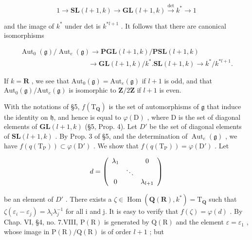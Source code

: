 \[
1 \longrightarrow \mathbf {S L} (l + 1, k) \longrightarrow \mathbf {G L} (l + 1, k) \stackrel {\det} {\longrightarrow} k ^ {*} \longrightarrow 1
\]

and the image of \(k^*\) under det is \(k^{*l + 1}\) . It follows that there are canonical isomorphisms

\[
\begin{array}{c} \operatorname{Aut} _ {0} (\mathfrak {g}) / \operatorname{Aut} _ {e} (\mathfrak {g}) \longrightarrow \mathbf {P G L} (l + 1, k) / \mathbf {P S L} (l + 1, k) \\ \qquad \qquad \qquad \qquad \qquad \longrightarrow \mathbf {G L} (l + 1, k) / k ^ {*}. \mathbf {S L} (l + 1, k) \longrightarrow k ^ {*} / k ^ {*   l + 1}. \end{array}
\]

If \(k = \mathbf{R}\) , we see that \(\mathrm{Aut}_0(\mathfrak{g}) = \mathrm{Aut}_e(\mathfrak{g})\) if \(l + 1\) is odd, and that \(\mathrm{Aut}_0(\mathfrak{g}) / \mathrm{Aut}_e(\mathfrak{g})\) is isomorphic to \(\mathbf{Z}/2\mathbf{Z}\) if \(l + 1\) is even.

With the notations of §5, \(f(\mathrm{T}_{\mathbf{Q}})\) is the set of automorphisms of \(\mathfrak{g}\) that induce the identity on \(\mathfrak{h}\), and hence is equal to \(\varphi(\mathrm{D})\) , where D is the set of diagonal elements of \(\mathbf{GL}(l+1,k)\) (§5, Prop. 4). Let \(D'\) be the set of diagonal elements of \(\mathbf{SL}(l+1,k)\) . By Prop. 3 of §5, and the determination of \(\operatorname{Aut}_{e}(\mathfrak{g})\) , we have \(f(q(\mathrm{T}_{\mathrm{P}})) \subset \varphi(\mathrm{D}')\) . We show that \(f(q(\mathrm{T}_{\mathrm{P}})) = \varphi(\mathrm{D}')\) . Let

\[
d = \left( \begin{array}{c c c} \lambda_ {1} & & 0 \\ & \ddots & \\ 0 & & \lambda_ {l + 1} \end{array} \right)
\]

be an element of \(D'\) . There exists a \(\zeta \in \operatorname{Hom}(\mathbf{Q}(\mathbf{R}), k^{*}) = \mathrm{T}_{\mathbf{Q}}\) such that \(\zeta(\varepsilon_{i} - \varepsilon_{j}) = \lambda_{i}\lambda_{j}^{-1}\) for all i and j. It is easy to verify that \(f(\zeta) = \varphi(d)\) . By Chap. VI, §4, no. 7.VIII, \(\mathrm{P}(\mathrm{R})\) is generated by \(\mathrm{Q}(\mathrm{R})\) and the element \(\varepsilon = \varepsilon_{1}\) , whose image in \(\mathrm{P}(\mathrm{R})/\mathrm{Q}(\mathrm{R})\) is of order \(l + 1\) ; but


